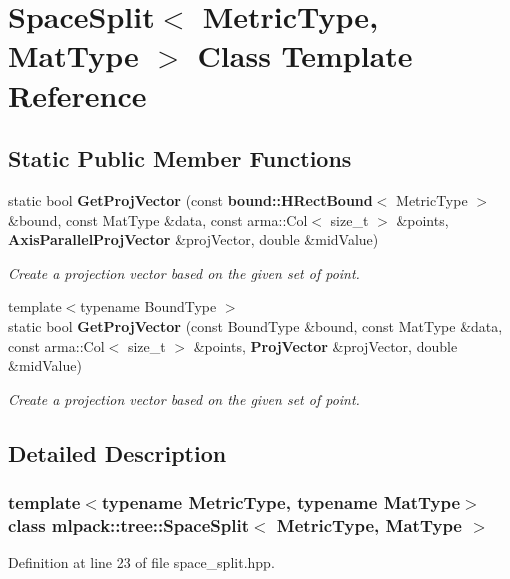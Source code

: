 \section{Space\+Split$<$ Metric\+Type, Mat\+Type $>$ Class Template Reference}
\label{classmlpack_1_1tree_1_1SpaceSplit}
\subsection*{Static Public Member Functions}
\begin{DoxyCompactItemize}
\item 
static bool \textbf{ Get\+Proj\+Vector} (const \textbf{ bound\+::\+H\+Rect\+Bound}$<$ Metric\+Type $>$ \&bound, const Mat\+Type \&data, const arma\+::\+Col$<$ size\+\_\+t $>$ \&points, \textbf{ Axis\+Parallel\+Proj\+Vector} \&proj\+Vector, double \&mid\+Value)
\begin{DoxyCompactList}\small\item\em Create a projection vector based on the given set of point. \end{DoxyCompactList}\item 
{\footnotesize template$<$typename Bound\+Type $>$ }\\static bool \textbf{ Get\+Proj\+Vector} (const Bound\+Type \&bound, const Mat\+Type \&data, const arma\+::\+Col$<$ size\+\_\+t $>$ \&points, \textbf{ Proj\+Vector} \&proj\+Vector, double \&mid\+Value)
\begin{DoxyCompactList}\small\item\em Create a projection vector based on the given set of point. \end{DoxyCompactList}\end{DoxyCompactItemize}


\subsection{Detailed Description}
\subsubsection*{template$<$typename Metric\+Type, typename Mat\+Type$>$\newline
class mlpack\+::tree\+::\+Space\+Split$<$ Metric\+Type, Mat\+Type $>$}



Definition at line 23 of file space\+\_\+split.\+hpp.




